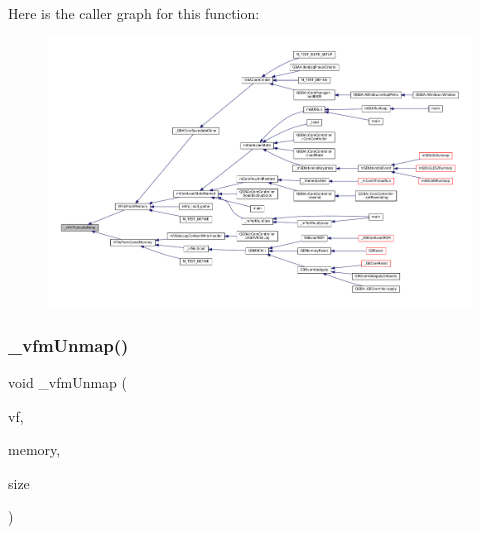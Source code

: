 Here is the caller graph for this function\+:
\nopagebreak
\begin{figure}[H]
\begin{center}
\leavevmode
\includegraphics[width=350pt]{vfs-mem_8c_a0fabe82c72e3197f1683775c0962f663_icgraph}
\end{center}
\end{figure}
\mbox{\label{vfs-mem_8c_adb2814f95df17c75543e3b5d5bb75c68}} 
\subsubsection{\texorpdfstring{\+\_\+vfm\+Unmap()}{\_vfmUnmap()}}
{\footnotesize\ttfamily void \+\_\+vfm\+Unmap (\begin{DoxyParamCaption}\item[{struct V\+File $\ast$}]{vf,  }\item[{void $\ast$}]{memory,  }\item[{size\+\_\+t}]{size }\end{DoxyParamCaption})\hspace{0.3cm}{\ttfamily [static]}}

